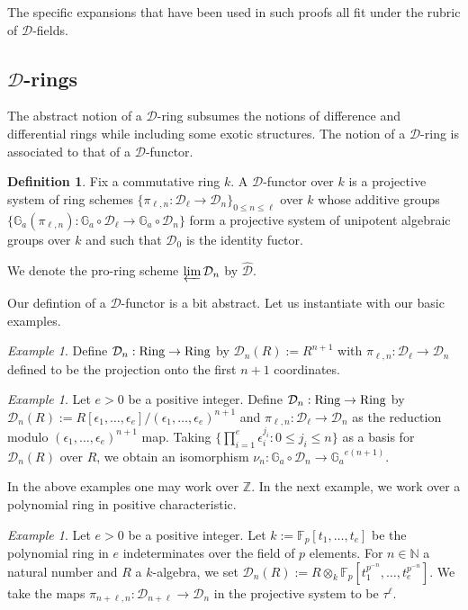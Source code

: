 \documentclass{amsart}
\newcommand{\Ga}{{{\mathbb G}_a}}
\newcommand{\FF}{{\mathbb F}}
\newcommand{\NN}{{\mathbb N}}
\newcommand{\ZZ}{{\mathbb Z}}
\newcommand{\cD}{{\mathcal D}}
\theoremstyle{definition}
\newtheorem{Def}[thm]{Definition}
\theoremstyle{remark}
\newtheorem{Example}[thm]{Example}
\begin{document}
The specific expansions that have been used in such proofs all fit under the 
rubric of $\cD$-fields.  


\subsection{$\cD$-rings}
The abstract notion of a $\cD$-ring subsumes the notions of difference 
and differential rings while including some exotic structures.  The notion 
of a $\cD$-ring is associated to that of a $\cD$-functor.

\begin{Def}  
Fix a commutative ring $k$.
A $\cD$-functor over $k$ is a projective system of ring schemes  
$\{ \pi_{\ell, n}:\cD_\ell \to \cD_n \}_{0 \leq n \leq \ell}$ over $k$
whose additive groups
$\{ \Ga(\pi_{\ell, n}): \Ga \circ \cD_\ell \to \Ga \circ \cD_n \}$
form a projective system of unipotent algebraic groups over $k$  
and such that $\cD_0$ is the identity fuctor.

We denote the pro-ring scheme $\varprojlim \cD_n$ by $\widehat{\cD}$.
\end{Def}

Our defintion of a $\cD$-functor is a bit abstract.  Let us instantiate with our
basic examples.

\begin{Example}
\label{product}
Define $\cD_n:{\rm Ring} \to {\rm Ring}$ by $\cD_n(R) := R^{n+1}$ with 
$\pi_{\ell,n}:\cD_\ell \to \cD_n$ defined to be the projection onto the 
first $n+1$ coordinates. 
\end{Example}

\begin{Example}
\label{psx}
Let $e > 0$ be a positive integer.
Define $\cD_n:{\rm Ring} \to {\rm Ring}$ by 
$\cD_n(R) := R[\epsilon_1, \ldots, \epsilon_e]/(\epsilon_1, \ldots, \epsilon_e)^{n+1}$
and $\pi_{\ell,n}:\cD_\ell \to \cD_n$ as the reduction modulo 
$(\epsilon_1, \ldots, \epsilon_e)^{n+1}$
map.  Taking $\{ \prod_{i=1}^e \epsilon_i^{j_i} : 0 \leq j_i \leq n \}$
 as a basis for $\cD_n(R)$
over $R$, we obtain an isomorphism $\nu_n: \Ga \circ \cD_n \to \Ga^{e(n+1)}$.  
\end{Example}

In the above examples one may work over $\ZZ$.  In the next example, we work over
a polynomial ring in positive characteristic.

\begin{Example}
\label{pext}
Let $e > 0$ be a positive integer. Let $k := \FF_p[t_1, \ldots, t_e]$ be
the polynomial ring in $e$ indeterminates over the field of $p$ elements.
For $n \in \NN$ a natural number and $R$ a $k$-algebra, we set 
$\cD_n(R) := R \otimes_k \FF_p[t_1^{p^{-n}}, \ldots, t_e^{p^{-n}}]$.  
We take the maps $\pi_{n+\ell,n}:\cD_{n+\ell} \to \cD_n$ in the 
projective system to be $\tau^\ell$.
\end{Example}
\end{document}
